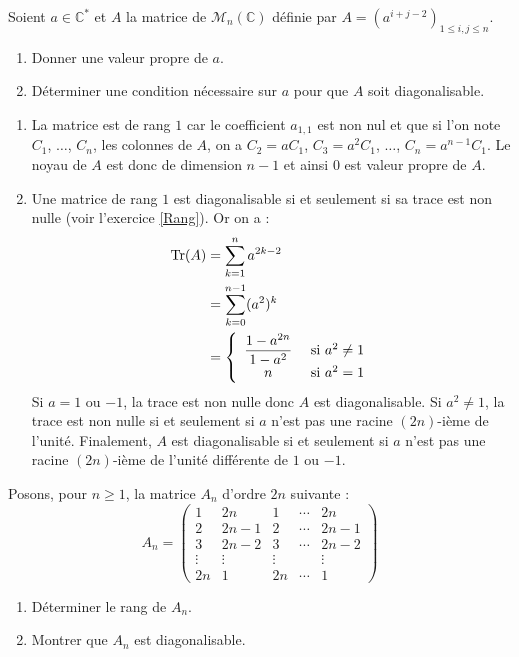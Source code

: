 \documentclass[a4paper,10pt]{report}
\begin{document}
\begin{Exa} Soient $a \in \mathbb{C}^*$ et $A$ la matrice de $\mathcal{M}_n(\mathbb{C})$ définie par $A=( a^{i+j-2})_{1 \leq i,j \leq n}$.

\begin{enumerate}
\item Donner une valeur propre de $a$.
\item Déterminer une condition nécessaire sur $a$ pour que $A$ soit diagonalisable.
\end{enumerate}
\end{Exa}

\corr 
\begin{enumerate}
\item La matrice est de rang $1$ car le coefficient $a_{1,1}$ est non nul et que si l'on note $C_1$, $\ldots$, $C_n$, les colonnes de $A$, on a $C_2= aC_1$, $C_3=a^2 C_1$, $\ldots$, $C_n=a^{n-1} C_1$. Le noyau de $A$ est donc de dimension $n-1$ et ainsi $0$ est valeur propre de $A$.
\item Une matrice de rang $1$ est diagonalisable si et seulement si sa trace est non nulle (voir l'exercice \ref{Rang}). Or on a :
\begin{align*}
 \textrm{Tr}(A) & = \sum_{k=1}^n a^{2k-2} \\
 & = \sum_{k=0}^{n-1} (a^2)^k \\
 & = \left\lbrace \begin{array}{cl}
 \dfrac{1-a^{2n}}{1-a^2} & \hbox{ si } a^2 \neq 1 \\
 n & \hbox{ si } a^2 = 1 
 \end{array}\right. 
 \end{align*}
 Si $a=1$ ou $-1$, la trace est non nulle donc $A$ est diagonalisable. Si $a^2 \neq 1$, la trace est non nulle si et seulement si $a$ n'est pas une racine $(2n)$-ième de l'unité. Finalement, $A$ est diagonalisable si et seulement si $a$ n'est pas une racine $(2n)$-ième de l'unité différente de $1$ ou $-1$.
\end{enumerate}

\begin{Exa} Posons, pour $n \geq 1$, la matrice $A_n$ d'ordre $2n$ suivante :
$$ A_n = \begin{pmatrix}
1 & 2n & 1 & \cdots & 2n \\
2 & 2n-1 & 2 & \cdots & 2n-1 \\
3 & 2n-2 & 3 & \cdots & 2n-2 \\
\vdots & \vdots & \vdots &  & \vdots \\
2n & 1 & 2n & \cdots & 1
\end{pmatrix}$$

\begin{enumerate}
\item Déterminer le rang de $A_n$.
\item Montrer que $A_n$ est diagonalisable.
\end{enumerate}
\end{Exa}
\end{document}
